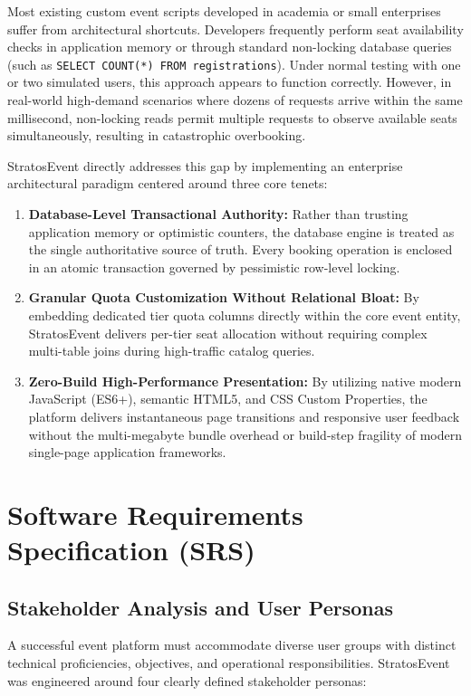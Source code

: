 \documentclass[11pt,a4paper]{report}
\begin{document}
Most existing custom event scripts developed in academia or small enterprises suffer from architectural shortcuts. Developers frequently perform seat availability checks in application memory or through standard non-locking database queries (such as \texttt{SELECT COUNT(*) FROM registrations}). Under normal testing with one or two simulated users, this approach appears to function correctly. However, in real-world high-demand scenarios where dozens of requests arrive within the same millisecond, non-locking reads permit multiple requests to observe available seats simultaneously, resulting in catastrophic overbooking.

StratosEvent directly addresses this gap by implementing an enterprise architectural paradigm centered around three core tenets:
\begin{enumerate}[leftmargin=1.5em, itemsep=0.6em]
    \item \textbf{Database-Level Transactional Authority:} Rather than trusting application memory or optimistic counters, the database engine is treated as the single authoritative source of truth. Every booking operation is enclosed in an atomic transaction governed by pessimistic row-level locking.
    \item \textbf{Granular Quota Customization Without Relational Bloat:} By embedding dedicated tier quota columns directly within the core event entity, StratosEvent delivers per-tier seat allocation without requiring complex multi-table joins during high-traffic catalog queries.
    \item \textbf{Zero-Build High-Performance Presentation:} By utilizing native modern JavaScript (ES6+), semantic HTML5, and CSS Custom Properties, the platform delivers instantaneous page transitions and responsive user feedback without the multi-megabyte bundle overhead or build-step fragility of modern single-page application frameworks.
\end{enumerate}



\chapter{Software Requirements Specification (SRS)}

\section{Stakeholder Analysis and User Personas}
\justifying
A successful event platform must accommodate diverse user groups with distinct technical proficiencies, objectives, and operational responsibilities. StratosEvent was engineered around four clearly defined stakeholder personas:
\end{document}
